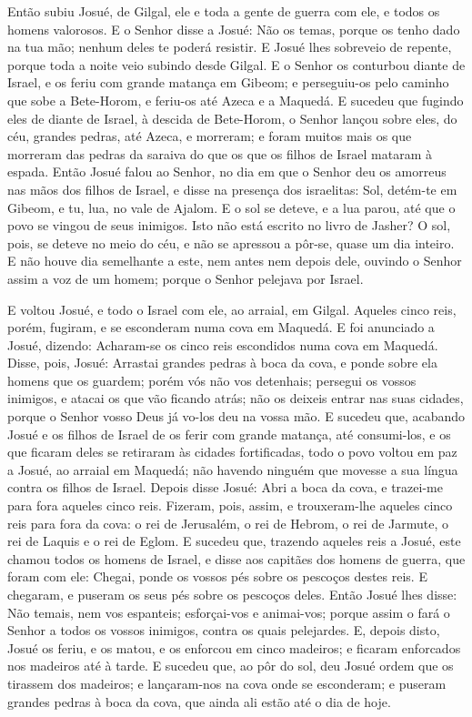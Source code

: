 Então subiu Josué, de Gilgal, ele e toda a gente de guerra com
ele, e todos os homens valorosos. E o Senhor disse a Josué: Não
os temas, porque os tenho dado na tua mão; nenhum deles te poderá
resistir. E Josué lhes sobreveio de repente, porque toda a noite
veio subindo desde Gilgal. E o Senhor os conturbou diante de
Israel, e os feriu com grande matança em Gibeom; e perseguiu-os pelo
caminho que sobe a Bete-Horom, e feriu-os até Azeca e a Maquedá.
E sucedeu que fugindo eles de diante de Israel, à descida de
Bete-Horom, o Senhor lançou sobre eles, do céu, grandes pedras, até
Azeca, e morreram; e foram muitos mais os que morreram das pedras da
saraiva do que os que os filhos de Israel mataram à espada.
Então Josué falou ao Senhor, no dia em que o Senhor deu os
amorreus nas mãos dos filhos de Israel, e disse na presença dos
israelitas: Sol, detém-te em Gibeom, e tu, lua, no vale de Ajalom.
E o sol se deteve, e a lua parou, até que o povo se vingou de
seus inimigos. Isto não está escrito no livro de Jasher? O sol,
pois, se deteve no meio do céu, e não se apressou a pôr-se, quase um
dia inteiro. E não houve dia semelhante a este, nem antes nem
depois dele, ouvindo o Senhor assim a voz de um homem; porque o
Senhor pelejava por Israel.

E voltou Josué, e todo o Israel com ele, ao arraial, em Gilgal.
Aqueles cinco reis, porém, fugiram, e se esconderam numa cova
em Maquedá. E foi anunciado a Josué, dizendo: Acharam-se os
cinco reis escondidos numa cova em Maquedá. Disse, pois,
Josué: Arrastai grandes pedras à boca da cova, e ponde sobre ela
homens que os guardem; porém vós não vos detenhais; persegui
os vossos inimigos, e atacai os que vão ficando atrás; não os
deixeis entrar nas suas cidades, porque o Senhor vosso Deus já
vo-los deu na vossa mão. E sucedeu que, acabando Josué e os
filhos de Israel de os ferir com grande matança, até consumi-los, e
os que ficaram deles se retiraram às cidades fortificadas,
todo o povo voltou em paz a Josué, ao arraial em Maquedá; não
havendo ninguém que movesse a sua língua contra os filhos de Israel.
Depois disse Josué: Abri a boca da cova, e trazei-me para
fora aqueles cinco reis. Fizeram, pois, assim, e
trouxeram-lhe aqueles cinco reis para fora da cova: o rei de
Jerusalém, o rei de Hebrom, o rei de Jarmute, o rei de Laquis e o
rei de Eglom. E sucedeu que, trazendo aqueles reis a Josué,
este chamou todos os homens de Israel, e disse aos capitães dos
homens de guerra, que foram com ele: Chegai, ponde os vossos pés
sobre os pescoços destes reis. E chegaram, e puseram os seus pés
sobre os pescoços deles. Então Josué lhes disse: Não temais,
nem vos espanteis; esforçai-vos e animai-vos; porque assim o fará o
Senhor a todos os vossos inimigos, contra os quais pelejardes.
E, depois disto, Josué os feriu, e os matou, e os enforcou em
cinco madeiros; e ficaram enforcados nos madeiros até à tarde.
E sucedeu que, ao pôr do sol, deu Josué ordem que os tirassem
dos madeiros; e lançaram-nos na cova onde se esconderam; e puseram
grandes pedras à boca da cova, que ainda ali estão até o dia de
hoje.

